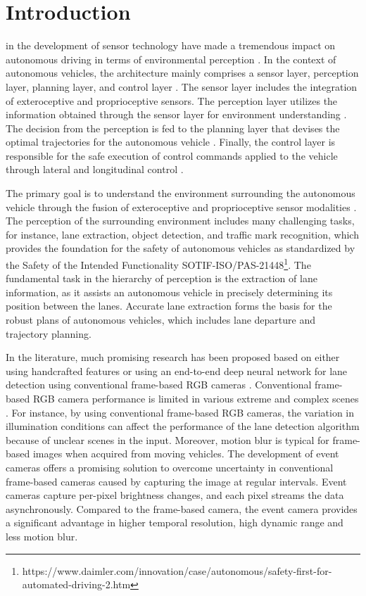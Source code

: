 \documentclass[journal]{IEEEtran}
\begin{document}
\IEEEpeerreviewmaketitle



\section{Introduction}
 in the development of sensor technology have made a tremendous impact on autonomous driving in terms of environmental perception  \cite{Bengler2014}.  In the context of autonomous vehicles, the architecture mainly comprises a sensor layer, perception layer, planning layer, and control layer \cite{swn}. The sensor layer includes the integration of exteroceptive and proprioceptive sensors. The perception layer utilizes the information obtained through the sensor layer for environment understanding \cite{Muresan}. The decision from the perception is fed to the planning layer that devises the optimal trajectories for the autonomous vehicle \cite{swn}. Finally, the control layer is responsible for the safe execution of control commands applied to the vehicle through lateral and longitudinal control \cite{Kim} \cite{Arkan} \cite{Azam}.
\par 
The primary goal is to understand the environment surrounding the autonomous vehicle through the fusion of exteroceptive and proprioceptive sensor modalities \cite{Munir2018}. The perception of the surrounding environment includes many challenging tasks, for instance, lane extraction, object detection, and traffic mark recognition, which provides the foundation for the safety of autonomous vehicles as standardized by the Safety of the Intended Functionality SOTIF-ISO/PAS-21448\footnote{https://www.daimler.com/innovation/case/autonomous/safety-first-for-automated-driving-2.htm}. The fundamental task in the hierarchy of perception is the extraction of lane information, as it assists an autonomous vehicle in precisely determining its position between the lanes. Accurate lane extraction forms the basis for the robust plans of autonomous vehicles, which includes lane departure and trajectory planning.
\par
In the literature, much promising research has been proposed based on either using handcrafted features or using an end-to-end deep neural network for lane detection using conventional frame-based RGB cameras \cite{Deusch2012} \cite{Jung2013} \cite{Kim2014} \cite{Li2016}. 
Conventional frame-based RGB camera performance is limited in various extreme and complex scenes \cite{Gallego2019}. For instance, by using conventional frame-based RGB cameras, the variation in illumination conditions can affect the performance of the lane detection algorithm because of unclear scenes in the input. Moreover, motion blur is typical for frame-based images when acquired from moving vehicles. The development of event cameras offers a promising solution to overcome uncertainty in conventional frame-based cameras caused by capturing the image at regular intervals. Event cameras capture per-pixel brightness changes, and each pixel streams the data asynchronously. Compared to the frame-based camera, the event camera provides a significant advantage in higher temporal resolution, high dynamic range and less motion blur.
\end{document}
